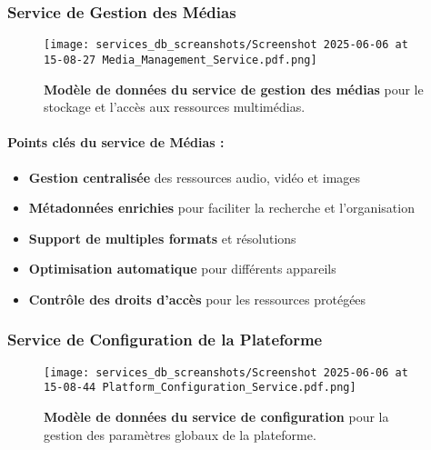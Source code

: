 \subsubsection{Service de Gestion des Médias}
\begin{figure}[h!]
  \centering
  \texttt{[image: services\_db\_screanshots/Screenshot 2025-06-06 at 15-08-27 Media\_Management\_Service.pdf.png]}
  \caption{\textbf{Modèle de données du service de gestion des médias} pour le stockage et l'accès aux ressources multimédias.}
  \label{fig:media_service}
\end{figure}
\vspace{-10pt}
\small
\paragraph{Points clés du service de Médias :}
\begin{itemize}[leftmargin=*,noitemsep,topsep=0pt]
  \item \textbf{Gestion centralisée} des ressources audio, vidéo et images
  \item \textbf{Métadonnées enrichies} pour faciliter la recherche et l'organisation
  \item \textbf{Support de multiples formats} et résolutions
  \item \textbf{Optimisation automatique} pour différents appareils
  \item \textbf{Contrôle des droits d'accès} pour les ressources protégées
\end{itemize}
\normalsize
\newpage

\subsubsection{Service de Configuration de la Plateforme}
\begin{figure}[h!]
  \centering
  \texttt{[image: services\_db\_screanshots/Screenshot 2025-06-06 at 15-08-44 Platform\_Configuration\_Service.pdf.png]}
  \caption{\textbf{Modèle de données du service de configuration} pour la gestion des paramètres globaux de la plateforme.}
  \label{fig:platform_config_service}
\end{figure}
\vspace{-10pt}
\small
